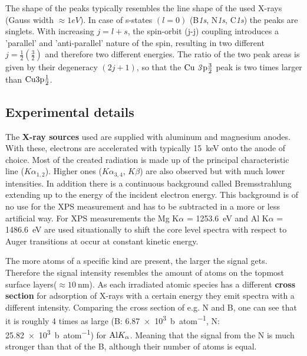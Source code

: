 The shape of the peaks typically resembles the line shape of the used X-rays (Gauss width $\approx 1eV$). In case of s-states $(l=0)$ (B\textit{1s}, N\textit{1s}, C\textit{1s}) the peaks are singlets. With increasing $j=l+s$, the spin-orbit (j-j) coupling introduces a 'parallel' and 'anti-parallel' nature of the spin, resulting in two different $j=\frac{1}{2}(\frac{3}{2})$ and therefore two different energies.
The ratio of the two peak areas is given by their degeneracy $(2j+1)$\cite[113]{Riviere_90}, so that the $\textnormal{Cu\ \textit{3}p}\frac{3}{2}$ peak is two times larger than $\textnormal{Cu3p}\frac{1}{2}$.

\subsection{Experimental details}
The \textbf{X-ray sources} used are supplied with aluminum and magnesium anodes.
With these, electrons are accelerated with typically \SI{15}{\keV} onto the anode of choice. Most of the created radiation is made up of the principal characteristic line ($K\alpha_{1,2}$). Higher ones ($K\alpha_{3,4}$, $K\beta$) are also observed but with much lower intensities. In addition there is a continuous background called Bremsstrahlung extending up to the energy of the incident electron energy. This background is of no use for the XPS measurement and has to be subtracted in a more or less artificial way. For XPS measurements the Mg K$\alpha$ = \SI{1253.6}{\eV} and Al K$\alpha$ = \SI{1486.6}{\eV} are used situationally to shift the core level spectra with respect to Auger transitions at occur at constant kinetic energy.

The more atoms of a specific kind are present, the larger the signal gets. Therefore the signal intensity resembles the amount of atoms on the topmost surface layers($\approx \SI{10}{\nm}$). As each irradiated atomic species has a different \textbf{cross section} for adsorption of X-rays with a certain energy they emit spectra with a different intensity. Comparing the cross section of e.g. N and B, one can see that it is roughly 4 times as large (B: \SI{6,87e3}{\barn\per atom}, N: \SI{25,82e3}{\barn\per atom}) for $\textnormal{Al} K_{\alpha}$\cite{henke_x-ray_1993}. Meaning that the signal from the N is much stronger than that of the B, although their number of atoms is equal.

